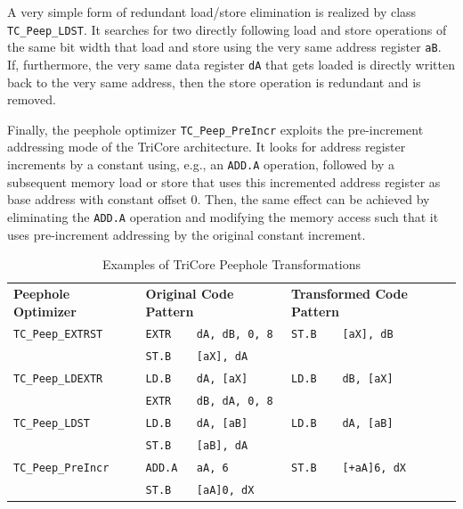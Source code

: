 A very simple form of redundant load/store elimination is realized by class \texttt{TC\_Peep\_LDST}.
It searches for two directly following load and store operations of the same bit width that load and store using the very same address register \texttt{aB}.
If, furthermore, the very same data register \texttt{dA} that gets loaded is directly written back to the very same address, then the store operation is redundant and is removed.

Finally, the peephole optimizer \texttt{TC\_Peep\_PreIncr} exploits the pre-increment addressing mode of the TriCore architecture.
It looks for address register increments by a constant using, e.g., an \texttt{ADD.A} operation, followed by a subsequent memory load or store that uses this incremented address register as base address with constant offset 0.
Then, the same effect can be achieved by eliminating the \texttt{ADD.A} operation and modifying the memory access such that it uses pre-increment addressing by the original constant increment.

\begin{table}[t]
  \begin{center}
    \caption{Examples of TriCore Peephole Transformations}
    \label{tab:tcpeep}
    \begin{tabular}{|l|l|l|}
      \hline
      \textbf{Peephole Optimizer} & \textbf{Original Code Pattern} & \textbf{Transformed Code Pattern} \\
      \hhline{|=|=|=|}
      \texttt{TC\_Peep\_EXTRST}  & \texttt{EXTR\ \ \ \ dA, dB, 0, 8} & \texttt{ST.B\ \ \ \ [aX], dB} \\
                                 & \texttt{ST.B\ \ \ \ [aX], dA} & \\
      \hline
      \texttt{TC\_Peep\_LDEXTR}  & \texttt{LD.B\ \ \ \ dA, [aX]} & \texttt{LD.B\ \ \ \ dB, [aX]} \\
                                 & \texttt{EXTR\ \ \ \ dB, dA, 0, 8} & \\
      \hline
      \texttt{TC\_Peep\_LDST}    & \texttt{LD.B\ \ \ \ dA, [aB]} & \texttt{LD.B\ \ \ \ dA, [aB]} \\
                                 & \texttt{ST.B\ \ \ \ [aB], dA} & \\
      \hline
      \texttt{TC\_Peep\_PreIncr} & \texttt{ADD.A\ \ \ aA, 6} & \texttt{ST.B\ \ \ \ [+aA]6, dX} \\
                                 & \texttt{ST.B\ \ \ \ [aA]0, dX} & \\
      \hline
    \end{tabular}
  \end{center}
\end{table}

